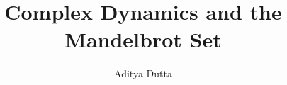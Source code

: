 \documentclass[a4paper,12pt,openany]{scrbook}
\author{Aditya Dutta}
\title{Complex Dynamics and the Mandelbrot Set}
\theoremstyle{plain}
\theoremstyle{remark}
\begin{document}
\frontmatter





\tableofcontents
\mainmatter






\medskip

\nocite{*}
\printbibliography
\end{document}
